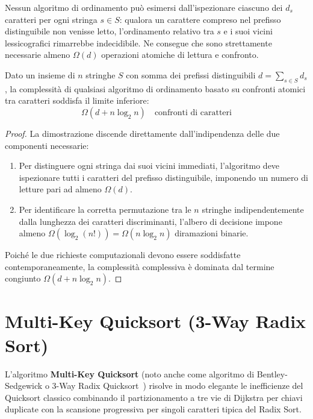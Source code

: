 Nessun algoritmo di ordinamento pu\`o esimersi dall'ispezionare ciascuno dei $d_s$ caratteri per ogni stringa $s \in S$: qualora un carattere compreso nel prefisso distinguibile non venisse letto, l'ordinamento relativo tra $s$ e i suoi vicini lessicografici rimarrebbe indecidibile. Ne consegue che sono strettamente necessarie almeno $\Omega(d)$ operazioni atomiche di lettura e confronto.

\begin{theorem}
\label{thm:lower-bound-string-sorting}
Dato un insieme di $n$ stringhe $S$ con somma dei prefissi distinguibili $d = \sum_{s \in S} d_s$, la complessit\`a di qualsiasi algoritmo di ordinamento basato su confronti atomici tra caratteri soddisfa il limite inferiore:
\begin{equation}
  \Omega(d + n \log_2 n) \quad \text{confronti di caratteri}
\end{equation}
\end{theorem}

\begin{proof}
La dimostrazione discende direttamente dall'indipendenza delle due componenti necessarie:
\begin{enumerate}
  \item Per distinguere ogni stringa dai suoi vicini immediati, l'algoritmo deve ispezionare tutti i caratteri del prefisso distinguibile, imponendo un numero di letture pari ad almeno $\Omega(d)$.
  \item Per identificare la corretta permutazione tra le $n$ stringhe indipendentemente dalla lunghezza dei caratteri discriminanti, l'albero di decisione impone almeno $\Omega(\log_2(n!)) = \Omega(n \log_2 n)$ diramazioni binarie.
\end{enumerate}
Poich\'e le due richieste computazionali devono essere soddisfatte contemporaneamente, la complessit\`a complessiva \`e dominata dal termine congiunto $\Omega(d + n \log_2 n)$.
\end{proof}

\FloatBarrier
\section{Multi-Key Quicksort (3-Way Radix Sort)}
\label{sec:multikey-quicksort}

L'algoritmo \textbf{Multi-Key Quicksort} (noto anche come algoritmo di Bentley-Sedgewick o 3-Way Radix Quicksort~\cite{bentley1997}) risolve in modo elegante le inefficienze del Quicksort classico combinando il partizionamento a tre vie di Dijkstra per chiavi duplicate con la scansione progressiva per singoli caratteri tipica del Radix Sort.

